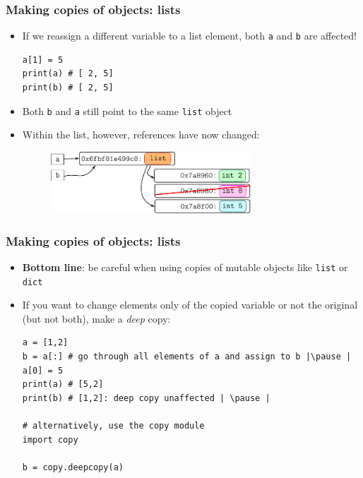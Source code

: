 \documentclass[xcolor=table]{beamer}
\begin{document}
\begin{frame}[fragile]
\frametitle{Making copies of objects: lists}
    \begin{itemize} 
        \item If we reassign a different variable to a list element, both \texttt{a} and \texttt{b} are affected! 
\begin{lstlisting}[style=python,belowskip=-0.8\baselineskip]
a[1] = 5
print(a) # [ 2, 5]
print(b) # [ 2, 5]
\end{lstlisting} \pause
        \item Both \texttt{b} and \texttt{a} still point to the same \texttt{list} object
        \item Within the list, however, references have now changed:
            \begin{figure}\centering%
                \includegraphics[width = 75mm]{variable_assignment4.pdf}
            \end{figure}
    \end{itemize}
\end{frame}

\begin{frame}[fragile]
\frametitle{Making copies of objects: lists}
    \begin{itemize}
        \item \textbf{Bottom line}: be careful when using copies of mutable objects like \texttt{list} or \texttt{dict}
        \item If you want to change elements only of the copied variable or not the original (but not both), make a \emph{deep} copy:
\begin{lstlisting}[style=python,belowskip=-0.8\baselineskip]
a = [1,2]
b = a[:] # go through all elements of a and assign to b |\pause |
a[0] = 5
print(a) # [5,2]
print(b) # [1,2]: deep copy unaffected | \pause |

# alternatively, use the copy module
import copy

b = copy.deepcopy(a)
\end{lstlisting} 
    \end{itemize}
\end{frame}
\end{document}
